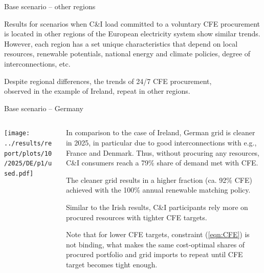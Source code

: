 \begin{frame}{Base scenario -- other regions}
  \centering
  
  Results for scenarios when C\&I load committed to a voluntary CFE procurement
  is located in other regions of the European electricity system
  show \alert{similar trends.} \\ 
  
  \vspace{0.3cm}
  However, each region has a set \alert{unique characteristics} 
  that depend on local resources, renewable potentials,
  national energy and climate policies, degree of interconnections, etc.

  \vspace{0.3cm}
  Despite regional differences, the trends of 24/7 CFE procurement, \\
  observed in the example of Ireland, repeat in other regions.

\end{frame}


\begin{frame}{Base scenario -- Germany}

  {\footnotesize
  \vspace{0.1cm}
  
  \begin{columns}[T]
  \begin{column}{9cm}
  \centering
  
  \texttt{[image: ../results/report/plots/10/2025/DE/p1/used.pdf]}
  \end{column}
  \begin{column}{6cm}
  
  \vspace{0.1cm}
  In comparison to the case of Ireland, German grid is cleaner in 2025, 
  in particular due to good interconnections with e.g., France and Denmark. 
  Thus, without procuring any resources, C\&I consumers reach
  a 79\% share of demand met with CFE.
 
  \vspace{0.3cm}
  The cleaner grid results in a higher fraction (ca. 92\% CFE)
  achieved with the 100\% annual renewable matching policy. 
  
  \vspace{0.3cm}
  Similar to the Irish results, C\&I participants rely more on procured 
  resources with tighter CFE targets.

  \vspace{0.3cm}
  Note that for lower CFE targets, constraint (\ref{eqn:CFE}) 
  is not binding, what makes the same cost-optimal shares of 
  procured portfolio and grid imports to repeat
  until CFE target becomes tight enough.
  
  \end{column}
  \end{columns}
  }
  \end{frame}
  
